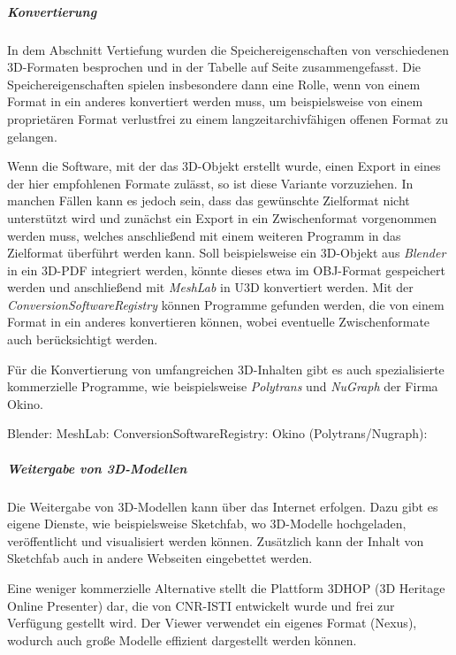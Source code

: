 \subparagraph{Konvertierung} 
In dem Abschnitt Vertiefung wurden die Speichereigenschaften von verschiedenen 3D-Formaten besprochen und in der Tabelle auf Seite \pageref{tab:3Deigenschaften} zusammengefasst. Die Speichereigenschaften spielen insbesondere dann eine Rolle, wenn von einem Format in ein anderes konvertiert werden muss, um beispielsweise von einem proprietären Format verlustfrei zu einem langzeitarchivfähigen offenen Format zu gelangen.

Wenn die Software, mit der das 3D-Objekt erstellt wurde, einen Export in eines der hier empfohlenen Formate zulässt, so ist diese Variante vorzuziehen. In manchen Fällen kann es jedoch sein, dass das gewünschte Zielformat nicht unterstützt wird und zunächst ein Export in ein Zwischenformat vorgenommen werden muss, welches anschließend mit einem weiteren Programm in das Zielformat überführt werden kann. Soll beispielsweise ein 3D-Objekt aus \emph{Blender} in ein 3D-PDF integriert werden, könnte dieses etwa im OBJ-Format gespeichert werden und anschließend mit \emph{MeshLab} in U3D konvertiert werden. Mit der \emph{ConversionSoftwareRegistry} können Programme gefunden werden, die von einem Format in ein anderes konvertieren können, wobei eventuelle Zwischenformate auch berücksichtigt werden.

Für die Konvertierung von umfangreichen 3D-Inhalten gibt es auch spezialisierte kommerzielle Programme, wie beispielsweise \emph{Polytrans} und \emph{NuGraph} der Firma Okino.

\begin{flushleft}
	Blender: 
	MeshLab: 
	ConversionSoftwareRegistry: 
	Okino (Polytrans/Nugraph): 
\end{flushleft}

\subparagraph{Weitergabe von 3D-Modellen}
Die Weitergabe von 3D-Modellen kann über das Internet erfolgen. Dazu gibt es eigene Dienste, wie beispielsweise Sketchfab, wo 3D-Modelle hochgeladen, veröffentlicht und visualisiert werden können. Zusätzlich kann der Inhalt von Sketchfab auch in andere Webseiten eingebettet werden.

Eine weniger kommerzielle Alternative stellt die Plattform 3DHOP (3D Heritage Online Presenter) dar, die von CNR-ISTI entwickelt wurde und frei zur Verfügung gestellt wird. Der Viewer verwendet ein eigenes Format (Nexus), wodurch auch große Modelle effizient dargestellt werden können.

